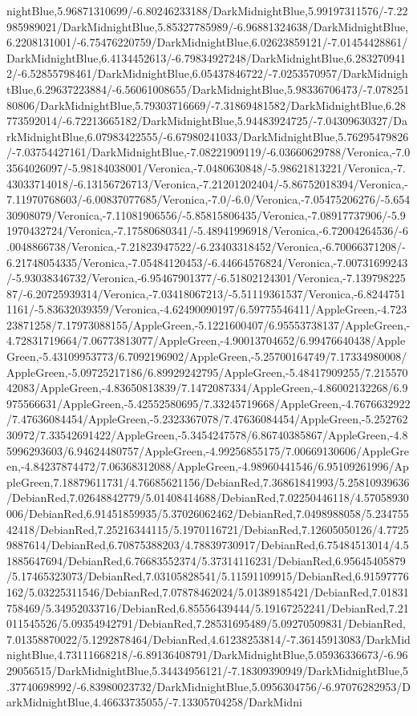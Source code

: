{\begin{tikzternal}
nightBlue,5.96871310699/-6.80246233188/DarkMidnightBlue,5.99197311576/-7.22985989021/DarkMidnightBlue,5.85327785989/-6.96881324638/DarkMidnightBlue,6.2208131001/-6.75476220759/DarkMidnightBlue,6.02623859121/-7.01454428861/DarkMidnightBlue,6.4134452613/-6.79834927248/DarkMidnightBlue,6.2832709412/-6.52855798461/DarkMidnightBlue,6.05437846722/-7.0253570957/DarkMidnightBlue,6.29637223884/-6.56061008655/DarkMidnightBlue,5.98336706473/-7.07825180806/DarkMidnightBlue,5.79303716669/-7.31869481582/DarkMidnightBlue,6.28773592014/-6.72213665182/DarkMidnightBlue,5.94483924725/-7.04309630327/DarkMidnightBlue,6.07983422555/-6.67980241033/DarkMidnightBlue,5.76295479826/-7.03754427161/DarkMidnightBlue,-7.08221909119/-6.03660629788/Veronica,-7.03564026097/-5.98184038001/Veronica,-7.0480630848/-5.98621813221/Veronica,-7.43033714018/-6.13156726713/Veronica,-7.21201202404/-5.86752018394/Veronica,-7.11970768603/-6.00837077685/Veronica,-7.0/-6.0/Veronica,-7.05475206276/-5.65430908079/Veronica,-7.11081906556/-5.85815806435/Veronica,-7.08917737906/-5.91970432724/Veronica,-7.17580680341/-5.48941996918/Veronica,-6.72004264536/-6.0048866738/Veronica,-7.21823947522/-6.23403318452/Veronica,-6.70066371208/-6.21748054335/Veronica,-7.05484120453/-6.44664576824/Veronica,-7.00731699243/-5.93038346732/Veronica,-6.95467901377/-6.51802124301/Veronica,-7.13979822587/-6.20725939314/Veronica,-7.03418067213/-5.51119361537/Veronica,-6.82447511161/-5.83632039359/Veronica,-4.62490090197/6.59775546411/AppleGreen,-4.72323871258/7.17973088155/AppleGreen,-5.1221600407/6.95553738137/AppleGreen,-4.72831719664/7.06773813077/AppleGreen,-4.90013704652/6.99476640438/AppleGreen,-5.43109953773/6.7092196902/AppleGreen,-5.25700164749/7.17334980008/AppleGreen,-5.09725217186/6.89929242795/AppleGreen,-5.48417909255/7.21557042083/AppleGreen,-4.83650813839/7.1472087334/AppleGreen,-4.86002132268/6.9975566631/AppleGreen,-5.42552580695/7.33245719668/AppleGreen,-4.7676632922/7.47636084454/AppleGreen,-5.2323367078/7.47636084454/AppleGreen,-5.25276230972/7.33542691422/AppleGreen,-5.3454247578/6.86740385867/AppleGreen,-4.85996293603/6.94624480757/AppleGreen,-4.99256855175/7.00669130606/AppleGreen,-4.84237874472/7.06368312088/AppleGreen,-4.98960441546/6.95109261996/AppleGreen,7.18879611731/4.76685621156/DebianRed,7.36861841993/5.25810939636/DebianRed,7.02648842779/5.01408414688/DebianRed,7.02250446118/4.57058930006/DebianRed,6.91451859935/5.37026062462/DebianRed,7.0498988058/5.23475542418/DebianRed,7.25216344115/5.1970116721/DebianRed,7.12605050126/4.77259887614/DebianRed,6.70875388203/4.78839730917/DebianRed,6.75484513014/4.51885647694/DebianRed,6.76683552374/5.37314116231/DebianRed,6.95645405879/5.17465323073/DebianRed,7.03105828541/5.11591109915/DebianRed,6.91597776162/5.03225311546/DebianRed,7.07878462024/5.01389185421/DebianRed,7.01831758469/5.34952033716/DebianRed,6.85556439444/5.19167252241/DebianRed,7.21011545526/5.09354942791/DebianRed,7.28531695489/5.09270509831/DebianRed,7.01358870022/5.1292878464/DebianRed,4.61238253814/-7.36145913083/DarkMidnightBlue,4.73111668218/-6.89136408791/DarkMidnightBlue,5.05936336673/-6.9629056515/DarkMidnightBlue,5.34434956121/-7.18309390949/DarkMidnightBlue,5.37740698992/-6.83980023732/DarkMidnightBlue,5.0956304756/-6.97076282953/DarkMidnightBlue,4.46633735055/-7.13305704258/DarkMidni
\end{tikzternal}}

